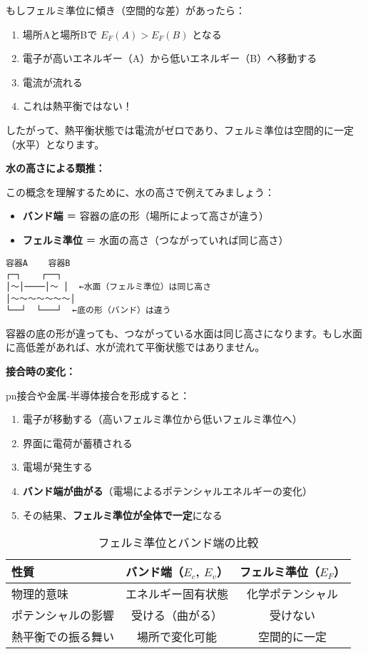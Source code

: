 もしフェルミ準位に傾き（空間的な差）があったら：

\begin{enumerate}
\item 場所Aと場所Bで $E_F(A) > E_F(B)$ となる
\item 電子が高いエネルギー（A）から低いエネルギー（B）へ移動する
\item 電流が流れる
\item これは熱平衡ではない！
\end{enumerate}

したがって、熱平衡状態では電流がゼロであり、フェルミ準位は空間的に一定（水平）となります。

\textbf{水の高さによる類推：}

この概念を理解するために、水の高さで例えてみましょう：

\begin{itemize}
\item \textbf{バンド端} ＝ 容器の底の形（場所によって高さが違う）
\item \textbf{フェルミ準位} ＝ 水面の高さ（つながっていれば同じ高さ）
\end{itemize}

\begin{verbatim}
容器A    容器B
┌─┐    ┌──┐
│～│────│～ │  ←水面（フェルミ準位）は同じ高さ
│～～～～～～～│
└──┘  └───┘  ←底の形（バンド）は違う
\end{verbatim}

容器の底の形が違っても、つながっている水面は同じ高さになります。もし水面に高低差があれば、水が流れて平衡状態ではありません。

\textbf{接合時の変化：}

pn接合や金属-半導体接合を形成すると：

\begin{enumerate}
\item 電子が移動する（高いフェルミ準位から低いフェルミ準位へ）
\item 界面に電荷が蓄積される
\item 電場が発生する
\item \textbf{バンド端が曲がる}（電場によるポテンシャルエネルギーの変化）
\item その結果、\textbf{フェルミ準位が全体で一定}になる
\end{enumerate}

\begin{table}[H]
\centering
\caption{フェルミ準位とバンド端の比較}
\begin{tabular}{|l|c|c|}
\hline
\textbf{性質} & \textbf{バンド端（$E_c$, $E_v$）} & \textbf{フェルミ準位（$E_F$）} \\
\hline
物理的意味 & エネルギー固有状態 & 化学ポテンシャル \\
\hline
ポテンシャルの影響 & 受ける（曲がる） & 受けない \\
\hline
熱平衡での振る舞い & 場所で変化可能 & 空間的に一定 \\
\hline
\end{tabular}
\end{table}

